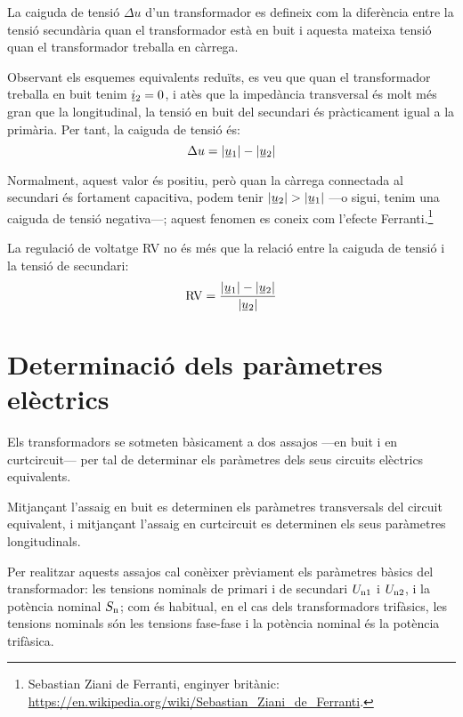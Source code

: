 La caiguda de tensió $\Delta u$ d'un transformador  es defineix com la diferència entre la tensió secundària quan el transformador està en buit i aquesta mateixa tensió quan el transformador treballa en càrrega.

Observant els esquemes equivalents reduïts, es veu que quan el transformador treballa en buit tenim $\cmplx{i}_2=0$, i atès que la impedància transversal és molt més gran que la longitudinal, la tensió en buit del secundari és pràcticament igual a la primària. Per tant, la caiguda de tensió és:
\begin{equation}
    \Delta u = |\cmplx{u}_1| - |\cmplx{u}_2|
\end{equation}

Normalment, aquest valor és positiu, però quan la càrrega connectada al secundari és fortament capacitiva, podem tenir  $|\cmplx{u}_2| > |\cmplx{u}_1|$ ---o sigui, tenim una caiguda de tensió negativa---; aquest fenomen  es coneix com l'efecte Ferranti.\footnote{Sebastian Ziani de Ferranti, enginyer britànic: \href{https://en.wikipedia.org/wiki/Sebastian_Ziani_de_Ferranti}{https:/\!\!/en.wikipedia.org/wiki/Sebastian\_Ziani\_de\_Ferranti}.}

La regulació de voltatge RV no és més que la relació entre la caiguda de tensió i la tensió de secundari:
\begin{equation}
    \text{RV} = \frac{|\cmplx{u}_1| - |\cmplx{u}_2|}{|\cmplx{u}_2|}
\end{equation}

\section{Determinació dels paràmetres elèctrics}\label{sec:determ-param-trafo}

Els transformadors se sotmeten bàsicament a dos assajos ---en
buit i en curtcircuit--- per tal de determinar els paràmetres
dels seus circuits elèctrics equivalents.

Mitjançant l'assaig en buit es determinen els paràmetres
transversals del circuit equivalent, i mitjançant l'assaig en curtcircuit es determinen els seus paràmetres longitudinals.

Per  realitzar aquests assajos cal conèixer prèviament els paràmetres
bàsics del transformador: les tensions nominals de primari i de
secundari $U_\mathrm{n1}$ i $U_\mathrm{n2}$, i la potència nominal
$S_\mathrm{n}$; com és habitual, en el cas dels transformadors
trifàsics, les tensions nominals són les tensions fase-fase i la
potència nominal és la potència trifàsica.


